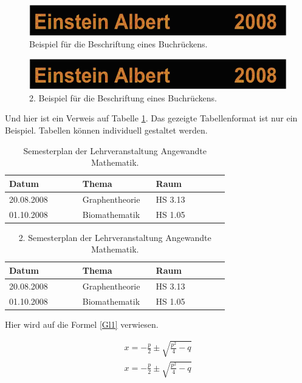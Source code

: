 \documentclass[MMR,Master,english]{twbook}
\begin{document}
\begin{figure}[!htbp]
\centering
\includegraphics[width=0.5\linewidth]{img/buchruecken}
\caption{Beispiel für die Beschriftung eines Buchrückens.}\label{Abb1}
\end{figure}
\begin{figure}[!htbp]
\centering
\includegraphics[width=0.5\linewidth]{img/buchruecken}
\caption{2. Beispiel für die Beschriftung eines Buchrückens.}\label{Abb2}
\end{figure}

Und hier ist ein Verweis auf Tabelle \ref{tab1}. Das gezeigte Tabellenformat ist nur ein Beispiel. Tabellen können individuell gestaltet werden.

\begin{table}[!htbp]
\centering
\caption{Semesterplan der Lehrveranstaltung \glqq Angewandte Mathematik\grqq.}\label{tab1}
\begin{tabular}{| p{0.3\linewidth} | p{0.3\linewidth} | p{0.3\linewidth} |}\hline
Datum & Thema & Raum\\\hline
20.08.2008 & Graphentheorie & HS 3.13\\
01.10.2008 & Biomathematik & HS 1.05\\\hline
\end{tabular}
\end{table}
\begin{table}[!htbp]
\centering
\caption{2. Semesterplan der Lehrveranstaltung \glqq Angewandte Mathematik\grqq.}\label{tab2}
\begin{tabular}{| p{0.3\linewidth} | p{0.3\linewidth} | p{0.3\linewidth} |}\hline
Datum & Thema & Raum\\\hline
20.08.2008 & Graphentheorie & HS 3.13\\
01.10.2008 & Biomathematik & HS 1.05\\\hline
\end{tabular}
\end{table}

Hier wird auf die Formel \ref{Gl1} verwiesen.

\begin{align}
x = -\frac{p}{2}\pm\sqrt{\frac{p^2}{4}-q}\label{Gl1}
\end{align}
\begin{align}
x = -\frac{p}{2}\pm\sqrt{\frac{p^2}{4}-q}\label{Gl2}
\end{align}
\end{document}
